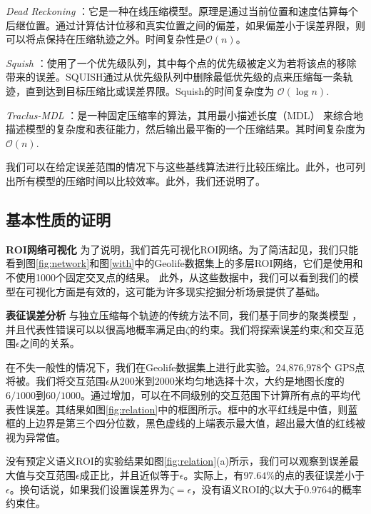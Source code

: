 \emph{Dead Reckoning} ：它是一种在线压缩模型。原理是通过当前位置和速度估算每个后继位置。通过计算估计位移和真实位置之间的偏差，如果偏差小于误差界限，则可以将点保持在压缩轨迹之外。时间复杂性是$\mathcal{O}(n)$。

\emph{Squish} ：使用了一个优先级队列，其中每个点的优先级被定义为若将该点的移除带来的误差。SQUISH通过从优先级队列中删除最低优先级的点来压缩每一条轨迹，直到达到目标压缩比或误差界限。Squish的时间复杂度为
$\mathcal{O}(\log n)$.

\emph{Traclus-MDL} ：是一种固定压缩率的算法，其用最小描述长度（MDL） 来综合地描述模型的复杂度和表征能力，然后输出最平衡的一个压缩结果。其时间复杂度为$\mathcal{O}(n)$.

我们可以在给定误差范围的情况下与这些基线算法进行比较压缩比。此外，也可列出所有模型的压缩时间以比较效率。此外，我们还说明了。



\subsection{基本性质的证明}
\vspace{3mm}
\noindent\textbf{ROI网络可视化}
为了说明，我们首先可视化ROI网络。为了简洁起见，我们只能看到图\ref{fig:network}和图\ref{with}中的Geolife数据集上的多层ROI网络，它们是使用和不使用1000个固定交叉点的结果。 此外，从这些数据中，我们可以看到我们的模型在可视化方面是有效的，这可能为许多现实挖掘分析场景提供了基础。


\vspace{3mm}
\noindent\textbf{表征误差分析}
与独立压缩每个轨迹的传统方法不同，我们基于同步的聚类模型 ，并且代表性错误可以以很高地概率满足由$\zeta$的约束。我们将探索误差约束$\zeta$和交互范围$\epsilon$之间的关系。

在不失一般性的情况下，我们在Geolife数据集上进行此实验。24,876,978个 GPS点将被。我们将交互范围$\epsilon$从200米到2000米均匀地选择十次，大约是地图长度的$6/1000$到$60/1000$。通过增加，可以在不同级别的交互范围下计算所有点的平均代表性误差。其结果如图\ref{fig:relation}中的框图所示。框中的水平红线是中值，则蓝框的上边界是第三个四分位数，黑色虚线的上端表示最大值，超出最大值的红线被视为异常值。

没有预定义语义ROI的实验结果如图\ref{fig:relation}(a)所示，我们可以观察到误差最大值与交互范围$\epsilon$成正比，并且近似等于$\epsilon$。实际上，有$97.64\%$的点的表征误差小于$\epsilon$。换句话说，如果我们设置误差界为$\zeta=\epsilon$，没有语义ROI的$\zeta$以大于$0.9764$的概率约束住。

